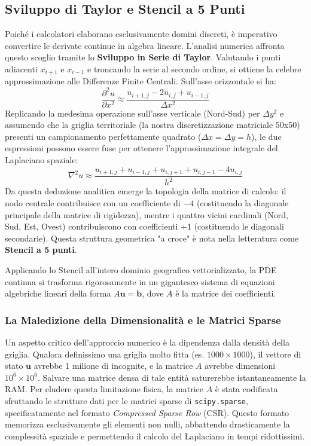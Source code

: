\documentclass[12pt,a4paper]{article}
\begin{document}
\subsection{Sviluppo di Taylor e Stencil a 5 Punti}
Poiché i calcolatori elaborano esclusivamente domini discreti, è imperativo convertire le derivate continue in algebra lineare. L'analisi numerica affronta questo scoglio tramite lo \textbf{Sviluppo in Serie di Taylor}. Valutando i punti adiacenti $x_{i+1}$ e $x_{i-1}$ e troncando la serie al secondo ordine, si ottiene la celebre approssimazione alle Differenze Finite Centrali. Sull'asse orizzontale si ha:
\begin{equation}
    \frac{\partial^2 u}{\partial x^2} \approx \frac{u_{i+1, j} - 2u_{i,j} + u_{i-1, j}}{\Delta x^2}
\end{equation}
Replicando la medesima operazione sull'asse verticale (Nord-Sud) per $\Delta y^2$ e assumendo che la griglia territoriale (la nostra discretizzazione matriciale 50x50) presenti un campionamento perfettamente quadrato ($\Delta x = \Delta y = h$), le due espressioni possono essere fuse per ottenere l'approssimazione integrale del Laplaciano spaziale:
\begin{equation}
    \nabla^2 u \approx \frac{u_{i+1, j} + u_{i-1, j} + u_{i, j+1} + u_{i, j-1} - 4u_{i,j}}{h^2}
\end{equation}
Da questa deduzione analitica emerge la topologia della matrice di calcolo: il nodo centrale contribuisce con un coefficiente di $-4$ (costituendo la diagonale principale della matrice di rigidezza), mentre i quattro vicini cardinali (Nord, Sud, Est, Ovest) contribuiscono con coefficienti $+1$ (costituendo le diagonali secondarie). Questa struttura geometrica "a croce" è nota nella letteratura come \textbf{Stencil a 5 punti}.

Applicando lo Stencil all'intero dominio geografico vettorializzato, la PDE continua si trasforma rigorosamente in un gigantesco sistema di equazioni algebriche lineari della forma $A \mathbf{u} = \mathbf{b}$, dove $A$ è la matrice dei coefficienti. 

\subsubsection{La Maledizione della Dimensionalità e le Matrici Sparse}
Un aspetto critico dell'approccio numerico è la dipendenza dalla densità della griglia. Qualora definissimo una griglia molto fitta (es. $1000 \times 1000$), il vettore di stato $\mathbf{u}$ avrebbe 1 milione di incognite, e la matrice $A$ avrebbe dimensioni $10^6 \times 10^6$. Salvare una matrice densa di tale entità saturerebbe istantaneamente la RAM.
Per eludere questa limitazione fisica, la matrice $A$ è stata codificata sfruttando le strutture dati per le matrici sparse di \texttt{scipy.sparse}, specificatamente nel formato \textit{Compressed Sparse Row} (CSR). Questo formato memorizza esclusivamente gli elementi non nulli, abbattendo drasticamente la complessità spaziale e permettendo il calcolo del Laplaciano in tempi ridottissimi.
\end{document}

